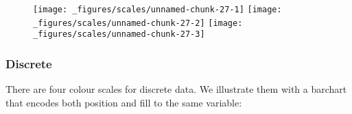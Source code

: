 \begin{Shaded}
\begin{Highlighting}[]
\StringTok{ }\NormalTok{(} \NormalTok{, } \OperatorTok{:}\NormalTok{, } \NormalTok{(}\NormalTok{, }\NormalTok{, }\NormalTok{, }\NormalTok{, }\NormalTok{))}
\StringTok{ }\OperatorTok{+}\StringTok{ }\NormalTok{(}\NormalTok{(} \NormalTok{)}
\OperatorTok{+}\StringTok{ }\NormalTok{(} \NormalTok{)}
\OperatorTok{+}\StringTok{ }\NormalTok{(} \NormalTok{, } \NormalTok{, } \NormalTok{)}
\end{Highlighting}
\end{Shaded}

\begin{figure}[H]
  \texttt{[image: \_figures/scales/unnamed-chunk-27-1]}%
  \texttt{[image: \_figures/scales/unnamed-chunk-27-2]}%
  \texttt{[image: \_figures/scales/unnamed-chunk-27-3]}
\end{figure}

\hypertarget{ssub:colour-discrete}{%
\subsubsection{Discrete}\label{ssub:colour-discrete}}

There are four colour scales for discrete data. We illustrate them with
a barchart that encodes both position and fill to the same variable:

